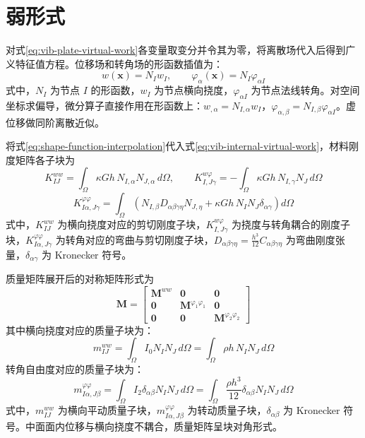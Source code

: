 \section{弱形式}

对式\eqref{eq:vib-plate-virtual-work}各变量取变分并令其为零，将离散场代入后得到广义特征值方程。位移场和转角场的形函数插值为：
\begin{equation}
w(\mathbf{x}) = N_I w_I, \qquad \varphi_\alpha(\mathbf{x}) = N_I \varphi_{\alpha I}
\label{eq:shape-function-interpolation}
\end{equation}
式中，$N_I$ 为节点 $I$ 的形函数，$w_I$ 为节点横向挠度，$\varphi_{\alpha I}$ 为节点法线转角。对空间坐标求偏导，微分算子直接作用在形函数上：$w_{,\alpha} = N_{I,\alpha}w_I$，$\varphi_{\alpha,\beta} = N_{I,\beta}\varphi_{\alpha I}$。虚位移做同阶离散近似。

将式\eqref{eq:shape-function-interpolation}代入式\eqref{eq:vib-internal-virtual-work}，材料刚度矩阵各子块为
\begin{equation}
K_{IJ}^{ww} = \int_\Omega \kappa G h\, N_{I,\alpha} N_{J,\alpha}\, d\Omega, \qquad K_{I,J\gamma}^{w\varphi} = -\int_\Omega \kappa G h\, N_{I,\gamma} N_J\, d\Omega
\label{eq:stiffness-ww-wphi}
\end{equation}
\begin{equation}
K_{I\alpha,J\gamma}^{\varphi\varphi} = \int_\Omega \left(N_{I,\beta} D_{\alpha\beta\gamma\eta} N_{J,\eta} + \kappa G h\, N_I N_J \delta_{\alpha\gamma}\right) d\Omega
\label{eq:stiffness-phiphi}
\end{equation}
式中，$K_{IJ}^{ww}$ 为横向挠度对应的剪切刚度子块，$K_{I,J\gamma}^{w\varphi}$ 为挠度与转角耦合的刚度子块，$K_{I\alpha,J\gamma}^{\varphi\varphi}$ 为转角对应的弯曲与剪切刚度子块，$D_{\alpha\beta\gamma\eta} = \frac{h^3}{12}C_{\alpha\beta\gamma\eta}$ 为弯曲刚度张量，$\delta_{\alpha\gamma}$ 为 Kronecker 符号。

质量矩阵展开后的对称矩阵形式为
\begin{equation}
\mathbf{M} = \begin{bmatrix}
\mathbf{M}^{ww} & \mathbf{0} & \mathbf{0} \\
\mathbf{0} & \mathbf{M}^{\varphi_1\varphi_1} & \mathbf{0} \\
\mathbf{0} & \mathbf{0} & \mathbf{M}^{\varphi_2\varphi_2}
\end{bmatrix}
\label{eq:mass-matrix-block}
\end{equation}
其中横向挠度对应的质量子块为：
\begin{equation}
m_{IJ}^{ww} = \int_\Omega I_0 N_I N_J\, d\Omega = \int_\Omega \rho h\, N_I N_J\, d\Omega
\label{eq:mass-ww}
\end{equation}
转角自由度对应的质量子块为：
\begin{equation}
m_{I\alpha,J\beta}^{\varphi\varphi} = \int_\Omega I_2 \delta_{\alpha\beta} N_I N_J\, d\Omega = \int_\Omega \frac{\rho h^3}{12} \delta_{\alpha\beta} N_I N_J\, d\Omega
\label{eq:mass-phiphi}
\end{equation}
式中，$m_{IJ}^{ww}$ 为横向平动质量子块，$m_{I\alpha,J\beta}^{\varphi\varphi}$ 为转动质量子块，$\delta_{\alpha\beta}$ 为 Kronecker 符号。中面面内位移与横向挠度不耦合，质量矩阵呈块对角形式。

